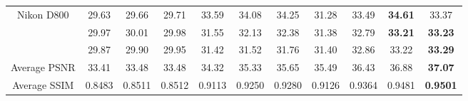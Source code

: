 \documentclass[10pt,twocolumn,letterpaper]{article}
\begin{document}
\begin{table}
\begin{center}
\begin{tabular}{|c||c|c|c|c|c|c|c|c|c|c|}
\multirow{3}{*}{Nikon D800} 
& 29.63 & 29.66 & 29.71 & 33.59 & 34.08 & 34.25 & 31.28 & 33.49 & \textbf{34.61} & 33.37
\\ 
\cline{2-11} 
\multirow{3}{*}{ISO = 6400}   
& 29.97 & 30.01 & 29.98 & 31.55 & 32.13 & 32.38 & 31.38 & 32.79 & \textbf{33.21} & \textbf{33.23}
\\ 
\cline{2-11}    
& 29.87 & 29.90 & 29.95 & 31.42 & 31.52 & 31.76 & 31.40 & 32.86 & 33.22 & \textbf{33.29}
\\
\hline
Average PSNR & 33.41 & 33.48 & 33.48 & 34.32 & 35.33 & 35.65 & 35.49 & 36.43 & 36.88 & \textbf{ 37.07}
\\
\hline
Average SSIM & 0.8483 & 0.8511 & 0.8512 & 0.9113 & 0.9250 & 0.9280 & 0.9126 & 0.9364 & 0.9481 & \textbf{ 0.9501}
\\
\hline
\end{tabular}
\end{center}
\end{table}
\end{document}
